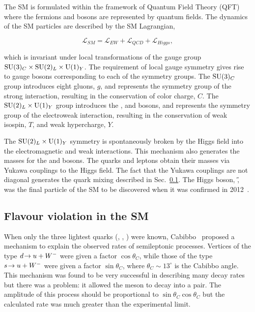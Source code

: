 The SM is formulated within the framework of Quantum Field Theory (QFT) where the fermions and bosons are represented by quantum fields. The dynamics of the SM particles are described by the SM Lagrangian,

\begin{equation}
\mathcal{L}_{SM} = \mathcal{L}_{EW} + \mathcal{L}_{QCD} + \mathcal{L}_{Higgs},
\end{equation}

\noindent which is invariant under local transformations of the gauge group ${\rm SU}(3)_{C} \times {\rm SU}(2)_{L} \times {\rm U}(1)_{Y}$. The requirement of local gauge symmetry gives rise to gauge bosons corresponding to each of the symmetry groups. The ${\rm SU}(3)_{C}$ group introduces eight gluons, $g$, and represents the symmetry group of the strong interaction, resulting in the conservation of color charge, $C$. The ${\rm SU}(2)_{L} \times {\rm U}(1)_{Y}$ group introduces the \Wpm, \Z and \g bosons, and represents the symmetry group of the electroweak interaction, resulting in the conservation of weak isospin, $T$, and weak hypercharge, $Y$. 

The ${\rm SU}(2)_{L} \times {\rm U}(1)_{Y}$ symmetry is spontaneously broken by the Higgs field into the electromagnetic and weak interactions. This mechanism also generates the masses for the \Wpm and \Z bosons. The quarks and leptons obtain their masses via Yukawa couplings to the Higgs field. The fact that the Yukawa couplings are not diagonal generates the quark mixing described in Sec.~\ref{sec:theory:flavourviolation}. The Higgs boson, \H, was the final particle of the SM to be discovered when it was confirmed in 2012~\cite{higgs-atlas,higgs-cms}.

\subsection{Flavour violation in the SM}
\label{sec:theory:flavourviolation}

When only the three lightest quarks (\uquark, \dquark, \squark) were known, Cabibbo~\cite{cabbibo} proposed a mechanism to explain the observed rates of semileptonic processes. Vertices of the type ${d}\!\rightarrow {\ensuremath{u}}+{W^-}$ were given a factor $\cos\theta_{C}$, while those of the type ${s}\!\rightarrow {\ensuremath{u}}+{W^-}$ were given a factor $\sin\theta_{C}$, where $\theta_{C}\sim13^{\circ}$ is the Cabibbo angle. This mechanism was found to be very successful in describing many decay rates but there was a problem: it allowed the \Kz meson to decay into a \mumu pair. The amplitude of this process should be proportional to $\sin\theta_{C}\cos\theta_{C}$ but the calculated rate was much greater than the experimental limit. 

